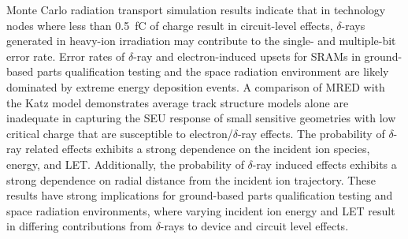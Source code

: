 Monte Carlo radiation transport simulation results indicate that in technology nodes where less than 0.5~fC of charge result in circuit-level effects, $\delta$-rays generated in heavy-ion irradiation may contribute to the single- and multiple-bit error rate.
Error rates of $\delta$-ray and electron-induced upsets for SRAMs in ground-based parts qualification testing and the space radiation environment are likely dominated by extreme energy deposition events.
A comparison of MRED with the Katz model demonstrates average track structure models alone are inadequate in capturing the SEU response of small sensitive geometries with low critical charge that are susceptible to electron/$\delta$-ray effects.
The probability of $\delta$-ray related effects exhibits a strong dependence on the incident ion species, energy, and LET.
Additionally, the probability of $\delta$-ray induced effects exhibits a strong dependence on radial distance from the incident ion trajectory.
These results have strong implications for ground-based parts qualification testing and space radiation environments, where varying incident ion energy and LET result in differing contributions from $\delta$-rays to device and circuit level effects.
